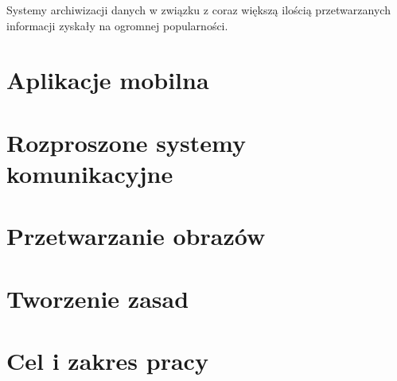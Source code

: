Systemy archiwizacji danych 	 w związku z coraz większą ilością przetwarzanych informacji zyskały na ogromnej popularności. 

\section{Aplikacje mobilna}
\section{Rozproszone systemy komunikacyjne}
\section{Przetwarzanie obrazów}
\section{Tworzenie zasad}

\section{Cel i zakres pracy}